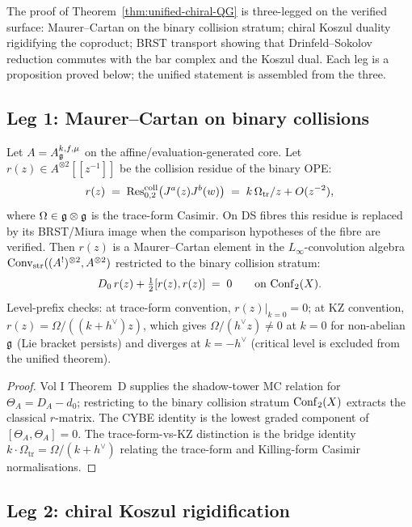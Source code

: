 The proof of Theorem~\ref{thm:unified-chiral-QG} is three-legged on
the verified surface:
Maurer--Cartan on the binary collision stratum; chiral Koszul duality
rigidifying the coproduct; BRST transport showing that
Drinfeld--Sokolov reduction commutes with the bar complex and the
Koszul dual. Each leg is a proposition proved below; the unified
statement is assembled from the three.

\subsection{Leg 1: Maurer--Cartan on binary collisions}
\label{subsec:leg-1-MC}

\begin{proposition}
\label{thm:r-matrix-from-MC}
Let $A = A_{\mathfrak{g}}^{k,f,\mu}$ on the affine/evaluation-generated core.
Let $r(z) \in A^{\otimes 2}[\![z^{-1}]\!]$ be the collision residue of
the binary OPE:
\[
 r(z) \;=\; \operatorname{Res}^{\mathrm{coll}}_{0,2}\bigl(J^a(z)J^b(w)\bigr)
 \;=\; k\,\Omega_{\mathrm{tr}}/z + O(z^{-2}),
\]
where $\Omega\in \mathfrak{g}\otimes\mathfrak{g}$ is the trace-form Casimir. On DS
fibres this residue is replaced by its BRST/Miura image when the
comparison hypotheses of the fibre are verified. Then $r(z)$ is a
Maurer--Cartan element in the
$L_{\infty}$-convolution algebra
$\operatorname{Conv}_{\mathrm{str}}((A^{!})^{\otimes 2}, A^{\otimes 2})$ restricted to the binary
collision stratum:
\[
 D_{0}\,r(z) + \tfrac{1}{2}[r(z), r(z)] \;=\; 0
 \qquad
 \text{on }\mathrm{Conf}_2(X).
\]
Level-prefix checks: at trace-form convention,
$r(z)|_{k=0} = 0$; at KZ convention, $r(z) = \Omega/((k+h^{\vee})z)$,
which gives
$\Omega/(h^{\vee} z)\neq 0$ at $k=0$ for non-abelian $\mathfrak{g}$ (Lie
bracket persists) and diverges at $k=-h^{\vee}$ (critical level is
excluded from the unified theorem).
\end{proposition}

\begin{proof}
Vol I Theorem~D supplies the shadow-tower MC relation for $\Theta_A =
D_A - d_0$; restricting to the binary collision stratum $\mathrm{Conf}_2(X)$
extracts the classical $r$-matrix. The CYBE identity is the lowest
graded component of $[\Theta_A, \Theta_A] = 0$. The trace-form-vs-KZ
distinction is the bridge identity
$k\cdot \Omega_{\mathrm{tr}} = \Omega/(k+h^{\vee})$ relating the
trace-form and Killing-form Casimir normalisations.
\end{proof}

\subsection{Leg 2: chiral Koszul rigidification}
\label{subsec:leg-2-koszul}

